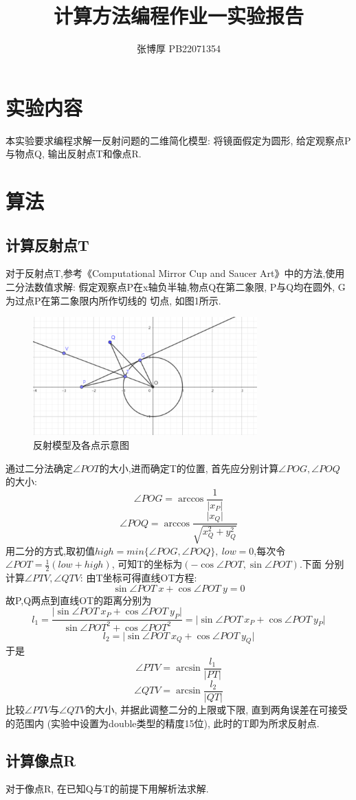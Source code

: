 \documentclass[12pt,a4paper,oneside]{article}
\title{计算方法编程作业一实验报告}
\author{张博厚 PB22071354}
\date{}
\begin{document}
\maketitle

\section{实验内容}
本实验要求编程求解一反射问题的二维简化模型: 将镜面假定为圆形, 给定观察点P与物点Q, 
输出反射点T和像点R.

\section{算法}
\subsection{计算反射点T}
对于反射点T,参考《Computational Mirror Cup and Saucer Art》中的方法,使用二分法数值求解:
假定观察点P在x轴负半轴,物点Q在第二象限, P与Q均在圆外, G为过点P在第二象限内所作切线的
切点, 如图1所示.
\begin{figure}[htbp]
    \centering
    \includegraphics[width = 0.77\textwidth]{figs/f.png}
    \caption{反射模型及各点示意图}
\end{figure}\par
通过二分法确定$\angle POT$的大小,进而确定T的位置, 首先应分别计算$\angle POG, \angle POQ$
的大小:
$$\angle POG = \arccos{\dfrac{1}{\lvert x_P \rvert}}$$
$$  \angle POQ = \arccos{\dfrac{\lvert x_Q \rvert}{\sqrt{x_Q^2+y_Q^2}}}$$
用二分的方式,取初值$high=min\{\angle POG,\angle POQ\},\ low=0$,每次令
$\angle POT = \frac{1}{2}(low+high)$, 可知T的坐标为$(-\cos{\angle POT}, \sin{\angle POT})$.下面
分别计算$\angle PTV, \angle QTV$: 由T坐标可得直线OT方程:
\begin{equation}
    \sin{\angle POT}\ x+\cos{\angle POT}\ y=0
\end{equation}
故P,Q两点到直线OT的距离分别为
\begin{equation*}
    l_1 = \dfrac{\lvert \sin{\angle POT}\ x_P+\cos{\angle POT}\ y_P \rvert}{\sin{\angle POT}^2+\cos{\angle POT}^2 }
        =\lvert \sin{\angle POT}\ x_P+\cos{\angle POT}\ y_P \rvert
\end{equation*}
\begin{equation*}
    l_2 = \lvert \sin{\angle POT}\ x_Q+\cos{\angle POT}\ y_Q \rvert
\end{equation*}
于是
$$\angle PTV = \arcsin{\dfrac{l_1}{\lvert PT \rvert}}$$
$$\angle QTV = \arcsin{\dfrac{l_2}{\lvert QT \rvert}}$$
比较$\angle PTV$与$\angle QTV$的大小, 并据此调整二分的上限或下限, 直到两角误差在可接受的范围内
(实验中设置为double类型的精度15位), 此时的T即为所求反射点.

\subsection{计算像点R}
对于像点R, 在已知Q与T的前提下用解析法求解.
\end{document}
